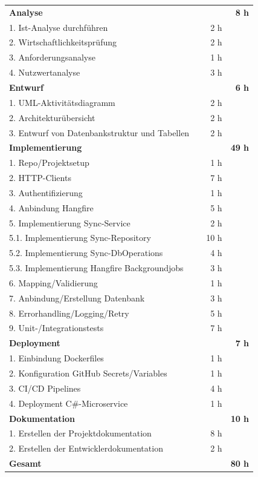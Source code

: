 \begin{tabularx}{\textwidth}{Xrrr}
\rowcolor{heading}\textbf{Analyse} & \textbf{} & \textbf{} & \textbf{8 h} \\
1. Ist-Analyse durchführen &       & 2 h   &  \\
\rowcolor{odd}2. Wirtschaftlichkeitsprüfung &    & 2 h      &  \\
3. Anforderungsanalyse &    & 1 h      &  \\
\rowcolor{odd}4. Nutzwertanalyse &    & 3 h      &  \\
\rowcolor{heading}\textbf{Entwurf} & \textbf{} & \textbf{} & \textbf{6 h} \\
1. UML-Aktivitätsdiagramm &       & 2 h   &  \\
\rowcolor{odd}2. Architekturübersicht &       & 2 h   &  \\
3. Entwurf von Datenbankstruktur und Tabellen &    & 2 h      &  \\
\rowcolor{heading}\textbf{Implementierung} & \textbf{} & \textbf{} & \textbf{49 h} \\
1. Repo/Projektsetup &       & 1 h   &  \\
\rowcolor{odd}2. HTTP-Clients &       & 7 h   &  \\
3. Authentifizierung &       & 1 h  &  \\
\rowcolor{odd}4. Anbindung Hangfire &   & 5 h       &  \\
5. Implementierung Sync-Service &    & 2 h      &  \\
\rowcolor{odd}5.1. Implementierung Sync-Repository &    & 10 h      &  \\
5.2. Implementierung Sync-DbOperations &    & 4 h      &  \\
\rowcolor{odd}5.3. Implementierung Hangfire Backgroundjobs &    & 3 h      &  \\
6. Mapping/Validierung &    & 1 h      &  \\
\rowcolor{odd}7. Anbindung/Erstellung Datenbank &    & 3 h      &  \\
8. Errorhandling/Logging/Retry &    & 5 h      &  \\
\rowcolor{odd}9. Unit-/Integrationstests &       & 7 h   &  \\
\rowcolor{heading}\textbf{Deployment} & \textbf{} & \textbf{} & \textbf{7 h} \\
1. Einbindung Dockerfiles &       & 1 h   &  \\
\rowcolor{odd}2. Konfiguration GitHub Secrets/Variables &       & 1 h   &  \\
3. CI/CD Pipelines &       & 4 h   &  \\
\rowcolor{odd}4. Deployment C\#-Microservice &       & 1 h   &  \\
\rowcolor{heading}\textbf{Dokumentation} & \textbf{} & \textbf{} & \textbf{10 h} \\
1. Erstellen der Projektdokumentation &       & 8 h   &  \\
\rowcolor{odd}2. Erstellen der Entwicklerdokumentation &       & 2 h   &  \\
\hline
\hline
\rowcolor{heading}\textbf{Gesamt} & \textbf{} & \textbf{} & \textbf{80 h} \\
\end{tabularx}
